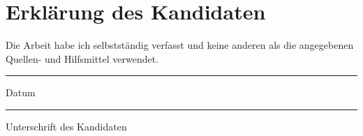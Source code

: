 \chapter{Erkl{\"a}rung des Kandidaten}

Die Arbeit habe ich selbstst{\"a}ndig verfasst und keine anderen als die angegebenen Quellen- und Hilfsmittel verwendet.

\vspace{2cm}

\begin{minipage}[t]{3cm}
\rule{3cm}{0.5pt}
Datum
\end{minipage}
\hfill
\begin{minipage}[t]{9cm}
\rule{9cm}{0.5pt}
Unterschrift des Kandidaten
\end{minipage}
